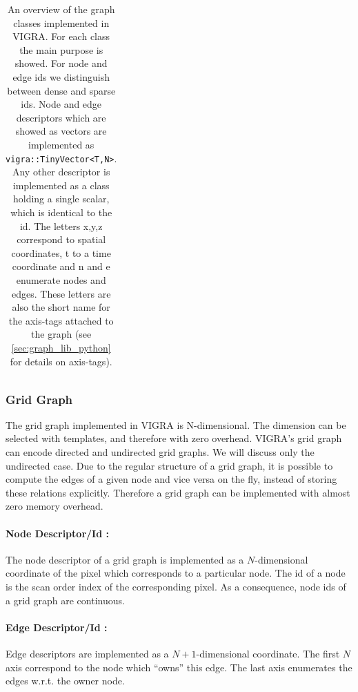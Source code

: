 \begin{table}[H]
\begin{tiny}
\begin{tabular}{|l|p{1.5cm}|p{0.5cm}|p{0.5cm}|p{0.6cm}|p{0.6cm}|p{0.6cm}|p{0.8cm}|p{0.8cm}|l|l|l|}
\end{tabular}
\end{tiny}
\caption[VIGRA's graph classes]{ \label{tab:graph_classes}
    An overview of the graph classes implemented in VIGRA.
    For each class the main purpose is showed.
    For node and edge ids we distinguish between dense  and sparse ids.
    Node and edge descriptors which are showed as vectors 
    are implemented as \lstinline{vigra::TinyVector<T,N>}.
    Any other descriptor is implemented as a class holding
    a single scalar, which is identical to the id.
    The letters x,y,z correspond to spatial coordinates, t to a time coordinate
    and n and e enumerate nodes and edges.
    These letters are also the short name for the axis-tags attached to the
    graph (see \cref{sec:graph_lib_python} for details on axis-tags).
}
\end{table}


\subsubsection{Grid Graph} \label{sec:graphs_grid_graph}

The grid graph implemented in VIGRA is N-dimensional.
The dimension can be selected with templates, and therefore with zero
overhead.
VIGRA's grid graph can encode directed and undirected grid graphs.
We will  discuss only the undirected case.
Due to the regular structure of a grid graph, it is possible to compute the edges of a given 
node and vice versa on the fly, instead of storing these relations explicitly.
Therefore a grid graph can be implemented with almost zero memory overhead.

\paragraph{Node Descriptor/Id :}
The node descriptor of a grid graph is implemented as a
$N$-dimensional coordinate of the pixel which corresponds to
a particular node. The id of a node is the scan order index
of the corresponding pixel.
As a consequence, node ids of a grid graph are continuous.
\paragraph{Edge Descriptor/Id :}
Edge descriptors are implemented as a $N+1$-dimensional coordinate.
The first $N$ axis correspond to the node which ``owns'' this edge.
The last axis enumerates the edges w.r.t. the owner node.

